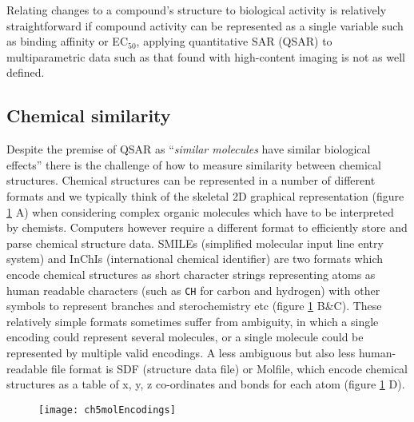 \documentclass[a4paper,11pt,twoside,openright]{scrbook}
\begin{document}
Relating changes to a compound's structure to biological activity is relatively straightforward if compound activity can be represented as a single variable such as binding affinity or EC$_{50}$, applying quantitative SAR (QSAR) to multiparametric data such as that found with high-content imaging is not as well defined.




\subsection{Chemical similarity}
Despite the premise of QSAR as ``\textsl{similar molecules} have similar biological effects'' there is the challenge of how to measure similarity between chemical structures.
Chemical structures can be represented in a number of different formats and we typically think of the skeletal 2D graphical representation (figure \ref{figure:mol_encodings} A) when considering complex organic molecules which have to be interpreted by chemists.
Computers however require a different format to efficiently store and parse chemical structure data.
SMILEs (simplified molecular input line entry system) and InChIs (international chemical identifier) are two formats which encode chemical structures as short character strings representing atoms as human readable characters (such as \texttt{CH} for carbon and hydrogen) with other symbols to represent branches and sterochemistry etc (figure \ref{figure:mol_encodings} B\&C).
These relatively simple formats sometimes suffer from ambiguity, in which a single encoding could represent several molecules, or a single molecule could be
represented by multiple valid encodings.
A less ambiguous but also less human-readable file format is SDF (structure data file) or Molfile, which encode chemical structures as a table of x, y, z co-ordinates and bonds for each atom (figure \ref{figure:mol_encodings} D).

\begin{figure}
     {
    \texttt{[image: ch5molEncodings]}
    \label{figure:mol_encodings}
}
\end{figure}
\end{document}
